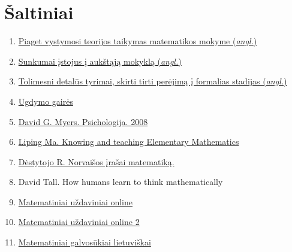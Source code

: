 \documentclass{article}
\begin{document}
\section{Šaltiniai}
\begin{enumerate}
\item \href{https://files.eric.ed.gov/fulltext/EJ841568.pdf}{Piaget vystymosi teorijos taikymas matematikos mokyme (\textit{angl.})}

\item \href{http://digitalcommons.unl.edu/cgi/viewcontent.cgi?article=1013&context=adaptessays}{Sunkumai įstojus į aukštąją mokyklą (\textit{angl.})}

\item \href{http://lib.dr.iastate.edu/cgi/viewcontent.cgi?article=7917&context=rtd}{Tolimesni detalūs tyrimai, skirti tirti perėjimą į formalias stadijas (\textit{angl.})}

\item \href{https://www.upc.smm.lt/ugdymas/dokumentai/svarstomi/matemat/Matematinio_ugdymo_gaires.pdf}{Ugdymo gairės}

\item \href{https://www.dropbox.com/s/vyghsx7k1ivd86g/David\%20G.\%20Myers\%20Psichologija\%202008.pdf?dl=0}{David G. Myers. Psichologija. 2008}

\item \href{https://www.dropbox.com/s/w0m9haikka8trpq/tuxdoc.com_liping-ma-knowing-and-teaching-elementary-mathematics-teachers-understanding-of-fundamental-mathematics-in-china-and-the-united-states.pdf?dl=0}{Liping Ma. Knowing and teaching Elementary Mathematics}

\item \href{http://norvaisa.lt}{Dėstytojo R. Norvaišos įrašai matematiką.}

\item David Tall. How humans learn to think mathematically

\item \href{https://brilliant.org/courses/}{Matematiniai uždaviniai online }

\item\href{https://artofproblemsolving.com/alcumus}{Matematiniai uždaviniai online 2}

\item \href{https://galvosukykla.wordpress.com/}{Matematiniai galvosūkiai lietuviškai}
\end{enumerate}
\end{document}
